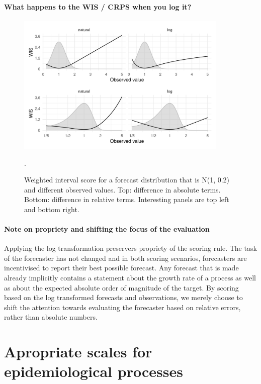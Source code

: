 \documentclass{article}
\begin{document}
\paragraph{What happens to the WIS / CRPS when you log it?}
\begin{figure}[h!]
    \centering
    \includegraphics[width=0.9\textwidth]{output/figures/SIM-effect-log-score.png}
    \caption{Weighted interval score for a forecast distribution that is N(1, 0.2) and different observed values. Top: difference in absolute terms. Bottom: difference in relative terms. Interesting panels are top left and bottom right.}. 
    \label{fig:log-crps-viz}
\end{figure}


\paragraph{Note on propriety and shifting the focus of the evaluation}
Applying the log transformation preservers propriety of the scoring rule. The task of the forecaster has not changed and in both scoring scenarios, forecasters are incentivised to report their best possible forecast. Any forecast that is made already implicitly contains a statement about the growth rate of a process as well as about the expected absolute order of magnitude of the target. By scoring based on the log transformed forecasts and observations, we merely choose to shift the attention towards evaluating the forecaster based on relative errors, rather than absolute numbers. 



\section{Apropriate scales for epidemiological processes}
\end{document}
